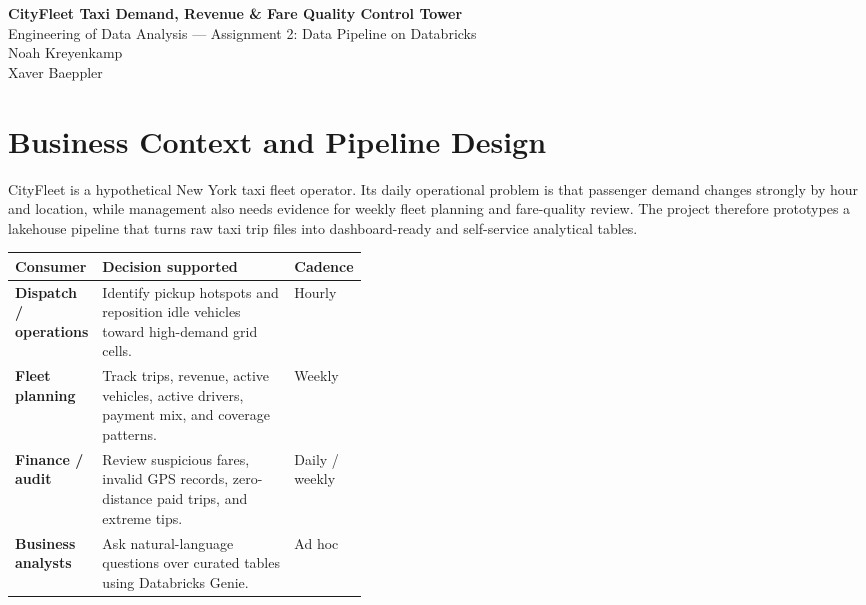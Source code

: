 \documentclass[10pt,a4paper]{article}
\begin{document}
\begin{center}
{\Large \textbf{CityFleet Taxi Demand, Revenue \& Fare Quality Control Tower}}\\
\vspace{2pt}
Engineering of Data Analysis --- Assignment 2: Data Pipeline on Databricks \\[5pt]
Noah Kreyenkamp \\[2pt]
Xaver Baeppler \\[4pt]
\end{center}

\section{Business Context and Pipeline Design}

CityFleet is a hypothetical New York taxi fleet operator. Its daily operational problem is that passenger demand changes strongly by hour and location, while management also needs evidence for weekly fleet planning and fare-quality review. The project therefore prototypes a lakehouse pipeline that turns raw taxi trip files into dashboard-ready and self-service analytical tables.

\begin{table}[H]
\centering
\small
\begin{tabularx}{\linewidth}{>{\bfseries}p{0.23\linewidth} X p{0.18\linewidth}}
\toprule
Consumer & Decision supported & Cadence \\
\midrule
Dispatch / operations & Identify pickup hotspots and reposition idle vehicles toward high-demand grid cells. & Hourly \\
Fleet planning & Track trips, revenue, active vehicles, active drivers, payment mix, and coverage patterns. & Weekly \\
Finance / audit & Review suspicious fares, invalid GPS records, zero-distance paid trips, and extreme tips. & Daily / weekly \\
Business analysts & Ask natural-language questions over curated tables using Databricks Genie. & Ad hoc \\
\bottomrule
\end{tabularx}
\end{table}
\end{document}

